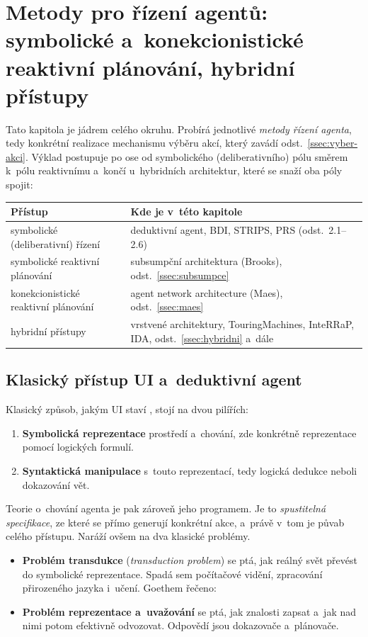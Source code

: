 \documentclass[11pt,a4paper]{article}
\theoremstyle{definition}
\begin{document}
\section{Metody pro řízení agentů: symbolické a~konekcionistické reaktivní
plánování, hybridní přístupy}
\label{sec:rizeni}

Tato kapitola je jádrem celého okruhu. Probírá jednotlivé \emph{metody řízení agenta}, tedy
konkrétní realizace mechanismu výběru akcí, který zavádí odst.~\ref{ssec:vyber-akci}. Výklad
postupuje po ose od symbolického (deliberativního) pólu směrem k~pólu reaktivnímu a~končí
u~hybridních architektur, které se snaží oba póly spojit:

\begin{center}
\small
\begin{tabular}{@{}p{} p{}@{}}
\toprule
\textbf{Přístup} & \textbf{Kde je v~této kapitole} \\
\midrule
symbolické (deliberativní) řízení
  & deduktivní agent, BDI, STRIPS, PRS (odst.\ 2.1--2.6) \\
symbolické reaktivní plánování
  & subsumpční architektura (Brooks), odst.~\ref{ssec:subsumpce} \\
konekcionistické reaktivní plánování
  & agent network architecture (Maes), odst.~\ref{ssec:maes} \\
hybridní přístupy
  & vrstvené architektury, TouringMachines, InteRRaP, IDA, odst.~\ref{ssec:hybridni} a~dále \\
\bottomrule
\end{tabular}
\end{center}
\subsection{Klasický přístup UI a~deduktivní agent}

Klasický způsob, jakým UI staví , stojí na dvou pilířích:
\begin{enumerate}
\item \textbf{Symbolická reprezentace} prostředí a~chování, zde konkrétně reprezentace pomocí
  logických formulí.
\item \textbf{Syntaktická manipulace} s~touto reprezentací, tedy logická dedukce neboli
  dokazování vět.
\end{enumerate}
Teorie o~chování agenta je pak zároveň jeho programem. Je to \emph{spustitelná specifikace},
ze které se přímo generují konkrétní akce, a~právě v~tom je půvab celého přístupu. Naráží
ovšem na dva klasické problémy.
\begin{itemize}
\item \textbf{Problém transdukce} (\emph{transduction problem}) se ptá, jak reálný svět převést
  do symbolické reprezentace. Spadá sem počítačové vidění, zpracování přirozeného jazyka
  i~učení. Goethem řečeno: 
\item \textbf{Problém reprezentace a~uvažování} se ptá, jak znalosti zapsat a~jak nad nimi
  potom efektivně odvozovat. Odpovědí jsou dokazovače a~plánovače.
\end{itemize}
\end{document}
